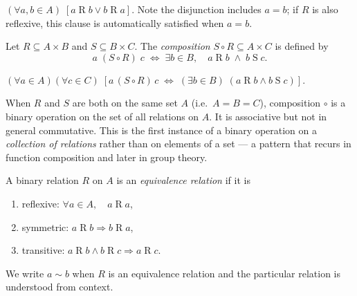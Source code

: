 \begin{remark}
$(\forall a,b \in A)\;[a \mathrel{R} b \lor b \mathrel{R} a]$.
Note the disjunction includes $a = b$; if $R$ is also reflexive, this
clause is automatically satisfied when $a = b$.
\end{remark}


\begin{tcolorbox}[colback=propbox, colframe=propborder, arc=2pt,
  left=6pt, right=6pt, top=4pt, bottom=4pt,
  title={\small\textbf{Definition (Composition of Relations)}},
  fonttitle=\small\bfseries]
\label{def:rel-composition}
Let $R \subseteq A \times B$ and $S \subseteq B \times C$.
The \emph{composition} $S \circ R \subseteq A \times C$ is defined by
\[
  a \;(S \circ R)\; c
  \;\iff\;
  \exists b \in B,\quad a \mathrel{R} b \;\land\; b \mathrel{S} c.
\]
\end{tcolorbox}

\begin{remark}
$(\forall a \in A)(\forall c \in C)\;
[a\,(S\circ R)\,c
\;\iff\;
(\exists b \in B)\;(a \mathrel{R} b \land b \mathrel{S} c)]$.
\end{remark}

\begin{remark}
When $R$ and $S$ are both on the same set $A$ (i.e.\ $A = B = C$),
composition $\circ$ is a binary operation on the set of all relations on $A$.
It is associative but not in general commutative.
This is the first instance of a binary operation on a \emph{collection of
relations} rather than on elements of a set — a pattern that recurs in
function composition and later in group theory.
\end{remark}


\begin{tcolorbox}[colback=propbox, colframe=propborder, arc=2pt,
  left=6pt, right=6pt, top=4pt, bottom=4pt,
  title={\small\textbf{Definition (Equivalence Relation)}},
  fonttitle=\small\bfseries]
\label{def:equiv-relation}
A binary relation $R$ on $A$ is an \emph{equivalence relation} if it is
\begin{enumerate}[label=(\roman*)]
  \item reflexive: $\forall a \in A,\quad a \mathrel{R} a$,
  \item symmetric: $a \mathrel{R} b \Rightarrow b \mathrel{R} a$,
  \item transitive: $a \mathrel{R} b \land b \mathrel{R} c \Rightarrow a \mathrel{R} c$.
\end{enumerate}
We write $a \sim b$ when $R$ is an equivalence relation and the
particular relation is understood from context.
\end{tcolorbox}

